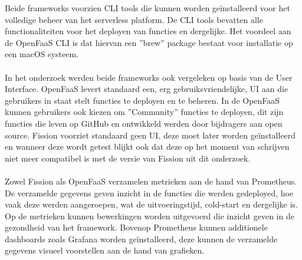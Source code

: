 \documentclass[a0,portrait]{a0poster}
\begin{document}
\begin{multicols}{2}
Beide frameworks voorzien CLI tools die kunnen worden geïnstalleerd voor het volledige beheer van het serverless platform. De CLI tools bevatten alle functionaliteiten voor het deployen van functies en dergelijke. Het voordeel aan de OpenFaaS CLI is dat hiervan een ''brew'' package bestaat voor installatie op een macOS systeem.
\\\\
In het onderzoek werden beide frameworks ook vergeleken op basis van de User Interface. OpenFaaS levert standaard een, erg gebruiksvriendelijke, UI aan die gebruikers in staat stelt functies te deployen en te beheren. In de OpenFaaS kunnen gebruikers ook kiezen om ''Community'' functies te deployen, dit zijn functies die leven op GitHub en ontwikkeld werden door bijdragers aan open source. Fission voorziet standaard geen UI, deze moet later worden geïnstalleerd en wanneer deze wordt getest blijkt ook dat deze op het moment van schrijven niet meer compatibel is met de versie van Fission uit dit onderzoek. 
\\\\
Zowel Fission als OpenFaaS verzamelen metrieken aan de hand van Prometheus. De verzamelde gegevens geven inzicht in de functies die werden gedeployed, hoe vaak deze werden aangeroepen, wat de uitvoeringstijd, cold-start en dergelijke is. Op de metrieken kunnen bewerkingen worden uitgevoerd die inzicht geven in de gezondheid van het framework. Bovenop Prometheus kunnen additionele dashboards zoals Grafana worden geïnstalleerd, deze kunnen de verzamelde gegevens visueel voorstellen aan de hand van grafieken.



\color{HoGentAccent1} 

\end{multicols}
\end{document}
